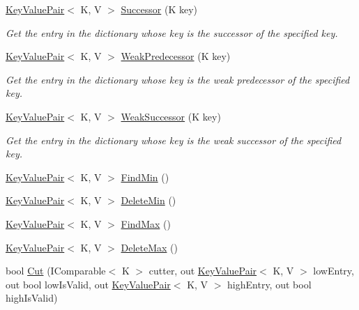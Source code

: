 \begin{DoxyCompactItemize}
\hyperlink{struct_c5_1_1_key_value_pair}{Key\+Value\+Pair}$<$ K, V $>$ \hyperlink{class_c5_1_1_sorted_dictionary_base_a56aae5d5648ebea30b0d7ef5905d5054}{Successor} (K key)
\begin{DoxyCompactList}\small\item\em Get the entry in the dictionary whose key is the successor of the specified key. \end{DoxyCompactList}\item 
\hyperlink{struct_c5_1_1_key_value_pair}{Key\+Value\+Pair}$<$ K, V $>$ \hyperlink{class_c5_1_1_sorted_dictionary_base_ae49ac36b21fd53897e8bd309c68e239b}{Weak\+Predecessor} (K key)
\begin{DoxyCompactList}\small\item\em Get the entry in the dictionary whose key is the weak predecessor of the specified key. \end{DoxyCompactList}\item 
\hyperlink{struct_c5_1_1_key_value_pair}{Key\+Value\+Pair}$<$ K, V $>$ \hyperlink{class_c5_1_1_sorted_dictionary_base_a36671a62ac8529d33d8c3d7c4baefd1e}{Weak\+Successor} (K key)
\begin{DoxyCompactList}\small\item\em Get the entry in the dictionary whose key is the weak successor of the specified key. \end{DoxyCompactList}\item 
\hyperlink{struct_c5_1_1_key_value_pair}{Key\+Value\+Pair}$<$ K, V $>$ \hyperlink{class_c5_1_1_sorted_dictionary_base_a446d4d492669d870b7425833b6ee3541}{Find\+Min} ()
\item 
\hyperlink{struct_c5_1_1_key_value_pair}{Key\+Value\+Pair}$<$ K, V $>$ \hyperlink{class_c5_1_1_sorted_dictionary_base_ac617b3bc61babd7befa68ff34c94bc39}{Delete\+Min} ()
\item 
\hyperlink{struct_c5_1_1_key_value_pair}{Key\+Value\+Pair}$<$ K, V $>$ \hyperlink{class_c5_1_1_sorted_dictionary_base_af2a6c83469b0ec03f8f25004b8433389}{Find\+Max} ()
\item 
\hyperlink{struct_c5_1_1_key_value_pair}{Key\+Value\+Pair}$<$ K, V $>$ \hyperlink{class_c5_1_1_sorted_dictionary_base_a9db0f7e83ba5fcb531e369a3930a0142}{Delete\+Max} ()
\item 
bool \hyperlink{class_c5_1_1_sorted_dictionary_base_a62c309d75f04e9fb947a03fd5fadbcc7}{Cut} (I\+Comparable$<$ K $>$ cutter, out \hyperlink{struct_c5_1_1_key_value_pair}{Key\+Value\+Pair}$<$ K, V $>$ low\+Entry, out bool low\+Is\+Valid, out \hyperlink{struct_c5_1_1_key_value_pair}{Key\+Value\+Pair}$<$ K, V $>$ high\+Entry, out bool high\+Is\+Valid)

\end{DoxyCompactItemize}
